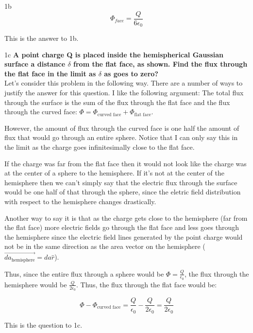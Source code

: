 \begin{homeworkProblem}[Quiz 3, Pr. 1]
\begin{homeworkSection}{1b}
        \[
        \Phi_{face} = \frac{Q}{6\epsilon_0}
        \]

        This is the answer to 1b.
    \end{homeworkSection}

    \begin{homeworkSection}{1c}
        \textbf{A point charge Q is placed inside the hemispherical
        Gaussian surface a distance $\delta$ from the flat face, as
        shown. Find the flux through the flat face in the limit as
        $\delta$ as goes to zero?}
        \\

        Let's consider this problem in the following way. There are a
        number of ways to justify the answer for this question. I like
        the following argument: The total flux through the surface is
        the sum of the flux through the flat face and the flux through
        the curved face: $\Phi = \Phi_{\text{curved face}}+
        \Phi_{\text{flat face}} $.
        
        However, the amount of flux through
        the curved face is one half the amount of flux that would go
        through an entire sphere. Notice that I can only say this in the
        limit as the charge goes infinitesimally close to the flat face.
       
        If the charge was far from the flat face then it would not look
        like the charge was at the center of a sphere to the hemisphere.
        If it's not at the center of the hemisphere then we can't simply
        say that the electric flux through the surface would be one half
        of that through the sphere, since the eletric field distribution
        with respect to the hemisphere changes drastically.

        Another way to say it is that as the charge gets close to the
        hemisphere (far from the flat face) more electric fields go
        through the flat face and less goes through the hemisphere since
        the electric field lines generated by the point charge would not
        be in the same direction as the area vector on the hemisphere
        ($\vec{da_{\text{hemisphere}}} = da \hat{r}$).

        Thus, since the entire flux through a sphere would be $\Phi =
        \frac{Q}{\epsilon_0}$, the flux through the hemisphere would be
        $\frac{Q}{2\epsilon_0}$. Thus, the flux through the flat face
        would be:

        \[ \Phi - \Phi_{\text{curved face}} = \frac{Q}{\epsilon_0} -
        \frac{Q}{2\epsilon_0} = \frac{Q}{2\epsilon_0} \]

        This is the question to 1c.

    \end{homeworkSection}
\end{homeworkProblem}
